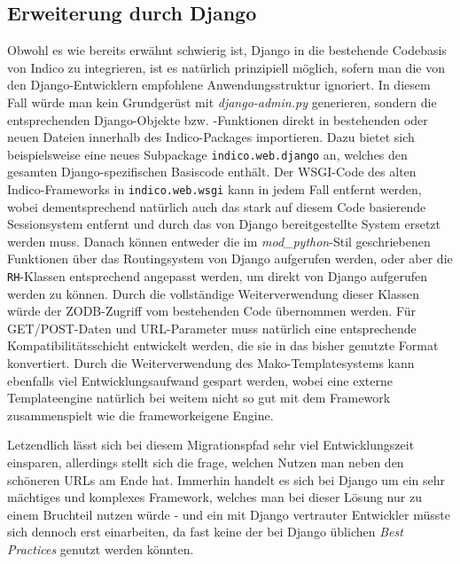\subsection{Erweiterung durch Django}
Obwohl es wie bereits erwähnt schwierig ist, Django in die bestehende Codebasis von Indico zu
integrieren, ist es natürlich prinzipiell möglich, sofern man die von den Django-Entwicklern
empfohlene Anwendungsstruktur ignoriert. In diesem Fall würde man kein Grundgerüst mit
\emph{django-admin.py} generieren, sondern die entsprechenden Django-Objekte bzw. -Funktionen direkt
in bestehenden oder neuen Dateien innerhalb des Indico-Packages importieren. Dazu bietet sich
beispielsweise eine neues Subpackage \lstinline{indico.web.django} an, welches den gesamten
Django-spezifischen Basiscode enthält. Der WSGI-Code des alten Indico-Frameworks in
\lstinline{indico.web.wsgi} kann in jedem Fall entfernt werden, wobei dementsprechend natürlich auch
das stark auf diesem Code basierende Sessionsystem entfernt und durch das von Django
bereitgestellte System ersetzt werden muss. Danach können entweder die im \emph{mod\_python}-Stil
geschriebenen Funktionen über das Routingsystem von Django aufgerufen werden, oder aber die
\lstinline{RH}-Klassen entsprechend angepasst werden, um direkt von Django aufgerufen werden zu
können. Durch die vollständige Weiterverwendung dieser Klassen würde der ZODB-Zugriff vom
bestehenden Code übernommen werden. Für GET/POST-Daten und URL-Parameter muss natürlich eine
entsprechende Kompatibilitätsschicht entwickelt werden, die sie in das bisher genutzte Format
konvertiert. Durch die Weiterverwendung des Mako-Templatesystems kann ebenfalls viel
Entwicklungsaufwand gespart werden, wobei eine externe Templateengine natürlich bei weitem nicht so
gut mit dem Framework zusammenspielt wie die frameworkeigene Engine.

Letzendlich lässt sich bei diesem Migrationspfad sehr viel Entwicklungszeit einsparen, allerdings
stellt sich die frage, welchen Nutzen man neben den schöneren URLs am Ende hat. Immerhin handelt es
sich bei Django um ein sehr mächtiges und komplexes Framework, welches man bei dieser Lösung nur zu
einem Bruchteil nutzen würde - und ein mit Django vertrauter Entwickler müsste sich dennoch erst
einarbeiten, da fast keine der bei Django üblichen \emph{Best Practices} genutzt werden könnten.


